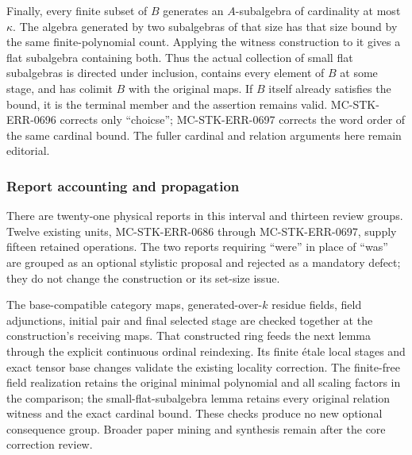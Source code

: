 Finally, every finite subset of \(B\) generates an \(A\)-subalgebra of cardinality at most \(\kappa\). The algebra generated by two subalgebras of that size has that size bound by the same finite-polynomial count. Applying the witness construction to it gives a flat subalgebra containing both. Thus the actual collection of small flat subalgebras is directed under inclusion, contains every element of \(B\) at some stage, and has colimit \(B\) with the original maps. If \(B\) itself already satisfies the bound, it is the terminal member and the assertion remains valid. MC-STK-ERR-0696 corrects only ``choicse''; MC-STK-ERR-0697 corrects the word order of the same cardinal bound. The fuller cardinal and relation arguments here remain editorial.

\subsubsection{Report accounting and propagation}\label{algebra-proof-064-report-accounting-and-propagation}

There are twenty-one physical reports in this interval and thirteen review groups. Twelve existing units, MC-STK-ERR-0686 through MC-STK-ERR-0697, supply fifteen retained operations. The two reports requiring ``were'' in place of ``was'' are grouped as an optional stylistic proposal and rejected as a mandatory defect; they do not change the construction or its set-size issue.

The base-compatible category maps, generated-over-\(k\) residue fields, field adjunctions, initial pair and final selected stage are checked together at the construction's receiving maps. That constructed ring feeds the next lemma through the explicit continuous ordinal reindexing. Its finite étale local stages and exact tensor base changes validate the existing locality correction. The finite-free field realization retains the original minimal polynomial and all scaling factors in the comparison; the small-flat-subalgebra lemma retains every original relation witness and the exact cardinal bound. These checks produce no new optional consequence group. Broader paper mining and synthesis remain after the core correction review.
